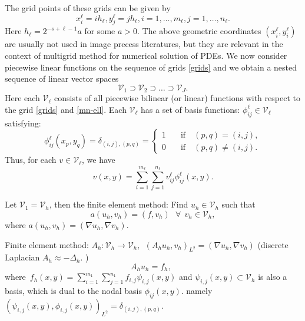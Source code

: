 The grid points of these grids can be given by
$$
x_i^{\ell}=i h_{\ell}, y_j^{\ell}=j h_{\ell},  i=1, \ldots, m_\ell,
j=1, \ldots, n_\ell.
$$
Here $h_{\ell} = 2^{-s + \ell -1}a$ for some $a >0$. The above geometric coordinates $(x_i^\ell, y_i^\ell)$
are usually not used in image precess literatures, but they are relevant
in the context of multigrid method for numerical solution of PDEs.
We now consider piecewise linear functions on the sequence of grids
\eqref{grids} and we obtain a nested sequence of linear vector spaces
\begin{equation}
\label{Vk}
\mathcal V_1\supset\mathcal V_2\supset\ldots\supset \mathcal
V_J.
\end{equation}
Here each $\mathcal V_\ell$ consists of all piecewise bilinear (or linear)
functions with respect to the grid \eqref{grids} and \eqref{mn-ell}.
Each $\mathcal V_\ell $ has a set of basis functions:
$\phi_{ij}^\ell\in \mathcal V_\ell$ satisfying:
$$
\phi_{ij}^\ell(x_p,y_q)=\delta_{(i,j), (p,q)} = 
\begin{cases}
1 \quad &\text{if} \quad (p,q) = (i,j), \\
0 \quad &{\text{if}} \quad (p,q)\neq (i,j).
\end{cases}
$$
Thus, for each $v \in \mathcal V_{\ell}$, we have 
\begin{equation}\label{expand}
v(x,y)=\sum_{i=1}^{m_\ell}\sum_{j=1}^{n_\ell}v^\ell_{ij}\phi_{ij}^\ell(x,y).
\end{equation}

Let $\mathcal  V_1=\mathcal  V_h$, then the finite element method: Find $u_h\in \mathcal  V_h$ such that 
\begin{equation}\label{FEdis}
a(u_h, v_h)=(f, v_h)~~~\forall~~v_h\in \mathcal  V_h,
\end{equation}
where $a(u_h, v_h)=(\nabla u_h, \nabla v_h)$.

Finite element method: $A_h: \mathcal  V_h\rightarrow \mathcal  V_h, ~~(A_hu_h,v_h)_{L^2}=(\nabla u_h, \nabla v_h)$ (discrete Laplacian $A_h\approx -\Delta_h$. )
\begin{equation}\label{FE:eq}
A_hu_h=f_h,~~ 
\end{equation}
where~$f_h(x,y)=\sum_{i=1}^{m_1}\sum_{j=1}^{n_1}f_{i,j}\psi_{i,j}(x,y)$ and $\psi_{i,j}(x,y)\subset \mathcal V_h$ is also a basis, 
which is dual to the nodal basis $\phi_{ij}(x,y)$. namely $(\psi_{i,j}(x,y), \phi_{i,j}(x,y))_{L^2}=\delta_{(i,j), (p,q)}$.

